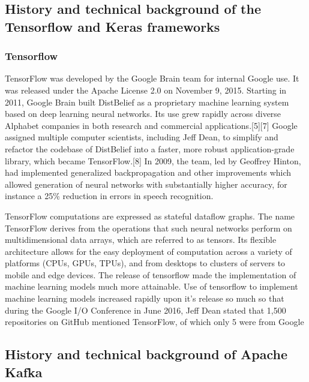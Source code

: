 \subsection{History and technical background of the Tensorflow and Keras frameworks}
\subsubsection{Tensorflow}
TensorFlow was developed by the Google Brain team for internal Google use. It was released under the Apache License 2.0 on November 9, 2015. Starting in 2011, Google Brain built DistBelief as a proprietary machine learning system based on deep learning neural networks. Its use grew rapidly across diverse Alphabet companies in both research and commercial applications.[5][7] Google assigned multiple computer scientists, including Jeff Dean, to simplify and refactor the codebase of DistBelief into a faster, more robust application-grade library, which became TensorFlow.[8] In 2009, the team, led by Geoffrey Hinton, had implemented generalized backpropagation and other improvements which allowed generation of neural networks with substantially higher accuracy, for instance a 25\% reduction in errors in speech recognition.

TensorFlow computations are expressed as stateful dataflow graphs. The name TensorFlow derives from the operations that such neural networks perform on multidimensional data arrays, which are referred to as tensors. Its flexible architecture allows for the easy deployment of computation across a variety of platforms (CPUs, GPUs, TPUs), and from desktops to clusters of servers to mobile and edge devices. The release of tensorflow made the implementation of machine learning models much more attainable. Use of tensorflow to implement machine learning models increased rapidly upon it's release so much so that during the Google I/O Conference in June 2016, Jeff Dean stated that 1,500 repositories on GitHub mentioned TensorFlow, of which only 5 were from Google

\subsection{History and technical background of Apache Kafka}